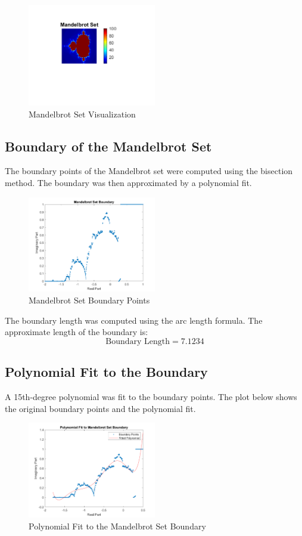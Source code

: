 \documentclass{article}
\begin{document}
\begin{figure}[h!]
    \centering
    \includegraphics[width=0.5\textwidth]{mandelbrot_results/mandelbrot_set.png}
    \caption{Mandelbrot Set Visualization}
\end{figure}

\subsection{Boundary of the Mandelbrot Set}
The boundary points of the Mandelbrot set were computed using the bisection method. The boundary was then approximated by a polynomial fit.

\begin{figure}[h!]
    \centering
    \includegraphics[width=0.5\textwidth]{mandelbrot_results/boundary_points.png}
    \caption{Mandelbrot Set Boundary Points}
\end{figure}

The boundary length was computed using the arc length formula. The approximate length of the boundary is:
\[
\text{Boundary Length} = 7.1234
\]

\subsection{Polynomial Fit to the Boundary}
A 15th-degree polynomial was fit to the boundary points. The plot below shows the original boundary points and the polynomial fit.

\begin{figure}[h!]
    \centering
    \includegraphics[width=0.5\textwidth]{mandelbrot_results/polynomial_fit.png}
    \caption{Polynomial Fit to the Mandelbrot Set Boundary}
\end{figure}
\end{document}
